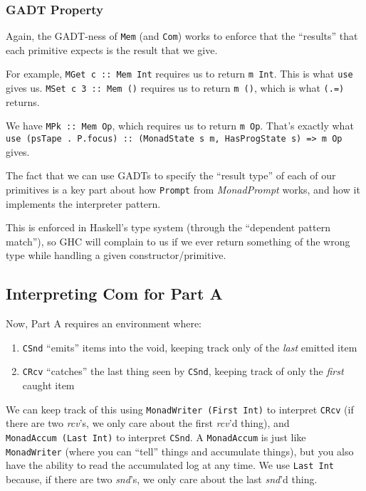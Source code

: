 \documentclass[]{article}
\begin{document}
\hypertarget{gadt-property}{%
\subsubsection{GADT Property}\label{gadt-property}}

Again, the GADT-ness of \texttt{Mem} (and \texttt{Com}) works to enforce that
the ``results'' that each primitive expects is the result that we give.

For example, \texttt{MGet\ \textquotesingle{}c\textquotesingle{}\ ::\ Mem\ Int}
requires us to return \texttt{m\ Int}. This is what \texttt{use} gives us.
\texttt{MSet\ \textquotesingle{}c\textquotesingle{}\ 3\ ::\ Mem\ ()} requires us
to return \texttt{m\ ()}, which is what \texttt{(.=)} returns.

We have \texttt{MPk\ ::\ Mem\ Op}, which requires us to return \texttt{m\ Op}.
That's exactly what
\texttt{use\ (psTape\ .\ P.focus)\ ::\ (MonadState\ s\ m,\ HasProgState\ s)\ =\textgreater{}\ m\ Op}
gives.

The fact that we can use GADTs to specify the ``result type'' of each of our
primitives is a key part about how \texttt{Prompt} from \emph{MonadPrompt}
works, and how it implements the interpreter pattern.

This is enforced in Haskell's type system (through the ``dependent pattern
match''), so GHC will complain to us if we ever return something of the wrong
type while handling a given constructor/primitive.

\hypertarget{interpreting-com-for-part-a}{%
\subsection{Interpreting Com for Part A}\label{interpreting-com-for-part-a}}

Now, Part A requires an environment where:

\begin{enumerate}
\def\labelenumi{\arabic{enumi}.}
\tightlist
\item
  \texttt{CSnd} ``emits'' items into the void, keeping track only of the
  \emph{last} emitted item
\item
  \texttt{CRcv} ``catches'' the last thing seen by \texttt{CSnd}, keeping track
  of only the \emph{first} caught item
\end{enumerate}

We can keep track of this using \texttt{MonadWriter\ (First\ Int)} to interpret
\texttt{CRcv} (if there are two \emph{rcv}'s, we only care about the first
\emph{rcv}'d thing), and \texttt{MonadAccum\ (Last\ Int)} to interpret
\texttt{CSnd}. A \texttt{MonadAccum} is just like \texttt{MonadWriter} (where
you can ``tell'' things and accumulate things), but you also have the ability to
read the accumulated log at any time. We use \texttt{Last\ Int} because, if
there are two \emph{snd}'s, we only care about the last \emph{snd}'d thing.
\end{document}
